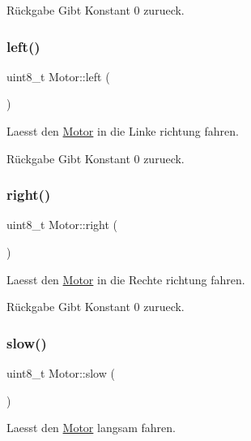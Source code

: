 \begin{DoxyReturn}{Rückgabe}
Gibt Konstant 0 zurueck. 
\end{DoxyReturn}
\hypertarget{class_motor_ae8af72c3a398bb959090d0be1083f5d7}{}\label{class_motor_ae8af72c3a398bb959090d0be1083f5d7} 
\subsubsection{\texorpdfstring{left()}{left()}}
{\footnotesize\ttfamily uint8\+\_\+t Motor\+::left (\begin{DoxyParamCaption}{ }\end{DoxyParamCaption})}

Laesst den \hyperlink{class_motor}{Motor} in die Linke richtung fahren.

\begin{DoxyReturn}{Rückgabe}
Gibt Konstant 0 zurueck. 
\end{DoxyReturn}
\hypertarget{class_motor_a517e585f6a9a335347f9a1230d2fc0e1}{}\label{class_motor_a517e585f6a9a335347f9a1230d2fc0e1} 
\subsubsection{\texorpdfstring{right()}{right()}}
{\footnotesize\ttfamily uint8\+\_\+t Motor\+::right (\begin{DoxyParamCaption}{ }\end{DoxyParamCaption})}

Laesst den \hyperlink{class_motor}{Motor} in die Rechte richtung fahren.

\begin{DoxyReturn}{Rückgabe}
Gibt Konstant 0 zurueck. 
\end{DoxyReturn}
\hypertarget{class_motor_a960a19729dc479265b1e5fea243de4c0}{}\label{class_motor_a960a19729dc479265b1e5fea243de4c0} 
\subsubsection{\texorpdfstring{slow()}{slow()}}
{\footnotesize\ttfamily uint8\+\_\+t Motor\+::slow (\begin{DoxyParamCaption}{ }\end{DoxyParamCaption})}

Laesst den \hyperlink{class_motor}{Motor} langsam fahren.

